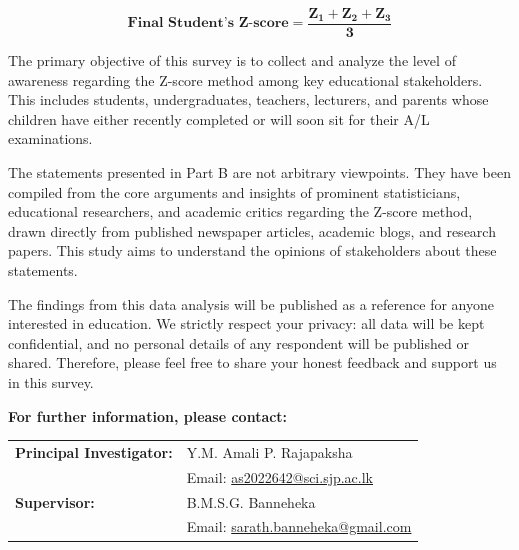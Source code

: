 \documentclass[12pt]{article}
\begin{document}
     \[
        \bm{\textbf{Final Student's Z-score}
      	=
     	\frac{Z_1+Z_2+Z_3}{3}}
     \]
	
	The primary objective of this survey is to collect and analyze the level of awareness regarding the Z-score method among key educational stakeholders. This includes students, undergraduates, teachers, lecturers, and parents whose children have either recently completed or will soon sit for their A/L examinations.
	\vspace{0.35cm}
	
	The statements presented in Part B are not arbitrary viewpoints. They have been compiled from the core arguments and insights of prominent statisticians, educational researchers, and academic critics regarding the Z-score method, drawn directly from published newspaper articles, academic blogs, and research papers. This study aims to understand the opinions of stakeholders about these statements.
	\vspace{0.35cm}
	
	The findings from this data analysis will be published as a reference for anyone interested in education. We strictly respect your privacy: all data will be kept confidential, and no personal details of any respondent will be published or shared. Therefore, please feel free to share your honest feedback and support us in this survey.
	
	\vspace{0.5cm}
	
	\noindent\textbf{For further information, please contact:}
	
	\vspace{0.3cm}
	
	\begin{tabular}{ll}
		\textbf{Principal Investigator:} & Y.M. Amali P. Rajapaksha \\
		& Email: \href{mailto:as2022642@sci.sjp.ac.lk}{as2022642@sci.sjp.ac.lk} \\[0.3cm]
		
		\textbf{Supervisor:} & B.M.S.G. Banneheka \\
		& Email: \href{mailto:sarath.banneheka@gmail.com}{sarath.banneheka@gmail.com}
	\end{tabular}
	
\end{document}
